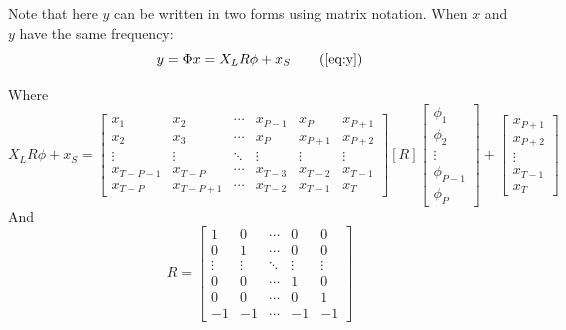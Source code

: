 \documentclass[11pt]{article}
\begin{document}
Note that here $y$ can be written in two forms using matrix notation. When $x$ and $y$ have the same frequency:
\begin{equation}
	y = \Phi x 			= X_{L}R\phi+x_{S}		\tag{\ref{eq:y}}
\end{equation}

Where
\begin{equation}
\label{eq:y_matrix}
	X_{L}R\phi+x_{S}	= 	\begin{bmatrix}
							x_{1} & x_{2} & \cdots & x_{P-1} & x_{P} & x_{P+1}\\
							x_{2} & x_{3} & \cdots & x_{P} & x_{P+1} & x_{P+2}\\
							\vdots & \vdots & \ddots & \vdots & \vdots & \vdots\\
							x_{T-P-1} & x_{T-P} & \cdots & x_{T-3} & x_{T-2} & x_{T-1}\\
							x_{T-P} & x_{T-P+1} & \cdots & x_{T-2} & x_{T-1} & x_{T}
						\end{bmatrix} 
						\left[R \right]
						\begin{bmatrix}
							\phi_{1}\\
							\phi_{2}\\
							\vdots\\
							\phi_{P-1}\\
							\phi_{P}
						\end{bmatrix} +
						\begin{bmatrix}
							x_{P+1}\\
							x_{P+2}\\
							\vdots\\
							x_{T-1}\\
							x_{T}
						\end{bmatrix}
\end{equation}
And
\begin{equation*}
	R = \begin{bmatrix}
			1 & 0 & \cdots & 0 & 0\\
			0 & 1 & \cdots & 0 & 0\\
			\vdots & \vdots & \ddots & \vdots & \vdots\\
			0 & 0 & \cdots & 1 & 0\\
			0 & 0 & \cdots & 0 & 1\\
			-1 & -1 & \cdots & -1 & -1
		\end{bmatrix}
\end{equation*}
\end{document}
